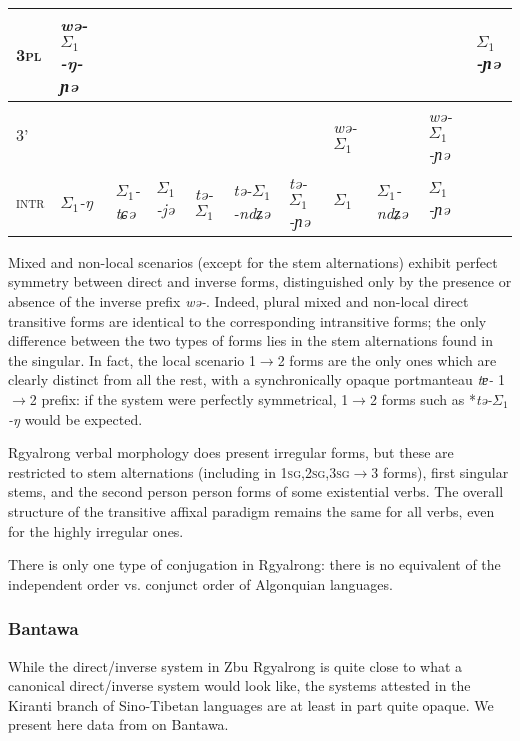\documentclass[twoside,a4paper,11pt]{article}
\newcommand{\ipa}[1]{{\phon\textit{#1}}}
\newcommand{\grise}[1]{\cellcolor{lightgray}\textbf{#1}}
\newcommand{\Σ}{\greek{Σ}}
\newcommand{\ra}{$\Sigma_1$}
\begin{document}
\begin{table}[h]
{\begin{tabular}{l|l|l|l|l|l|l|l|l|l|l}
\cline{2-2}	
\cline{11-11}
\textsc{3pl} &  \cellcolor[wave]{500}	\ipa{wə-\ra{}-ŋ-ɲə} & 	\cellcolor[wave]{500} & \cellcolor[wave]{500} & 	\cellcolor[wave]{500} & 	\cellcolor[wave]{500} & 	\cellcolor[wave]{500} & \multicolumn{3}{c|}{\grise{}} &	\ipa{\ra{}-ɲə} \\ 	
\hline
\textsc{3'} & 	\multicolumn{6}{c|}{\grise{}} &\cellcolor[wave]{500}	\ipa{wə-\ra{}} & 	\cellcolor[wave]{500}\ipa{wə-\ra{}-ndʑə} & \cellcolor[wave]{500}	\ipa{wə-\ra{}-ɲə} & 	\grise{} \\	
	\hline	\hline
\textsc{intr}&\ipa{\ra{}-ŋ}&\ipa{\ra{}-tɕə}&\ipa{\ra{}-jə}&\ipa{tə-\ra{}}&\ipa{tə-\ra{}-ndʑə}&\ipa{tə-\ra{}-ɲə}&\ipa{\ra{}}&\ipa{\ra{}-ndʑə} &\ipa{\ra{}-ɲə}& 	\grise{} \\	
	\hline
\end{tabular}}
\end{table}

 Mixed and non-local scenarios (except for the stem alternations) exhibit perfect symmetry between direct and inverse forms, distinguished only by the presence or absence of the inverse prefix \ipa{wə-}. Indeed, plural mixed and non-local direct transitive forms are identical to the corresponding intransitive forms; the only difference between the two types of forms lies in the stem alternations found in the singular. In fact, the local scenario 1$\rightarrow$2 forms are the only ones which are clearly distinct from all the rest, with a synchronically opaque portmanteau \ipa{tɐ-} 1$\rightarrow$2 prefix: if the system were perfectly symmetrical, 1$\rightarrow$2 forms such as *\ipa{tə-\ra{}-ŋ} would be expected.

Rgyalrong verbal morphology does present irregular forms, but these are restricted to stem alternations (including in \textsc{1sg,2sg,3sg$\rightarrow$3} forms), first singular stems, and the second person person forms of some existential verbs. The overall structure of the transitive affixal paradigm remains the same for all verbs, even for the   highly irregular ones.

There is only one type of conjugation in Rgyalrong: there is no equivalent of the independent order vs. conjunct order of Algonquian languages.




\subsubsection{Bantawa}

While the direct/inverse system in Zbu Rgyalrong is quite close to what a canonical direct/inverse system would look like, the systems attested in the Kiranti branch of Sino-Tibetan languages are at least in part quite opaque. We present here data from \cite{doornenbal09} on Bantawa.
\end{document}
